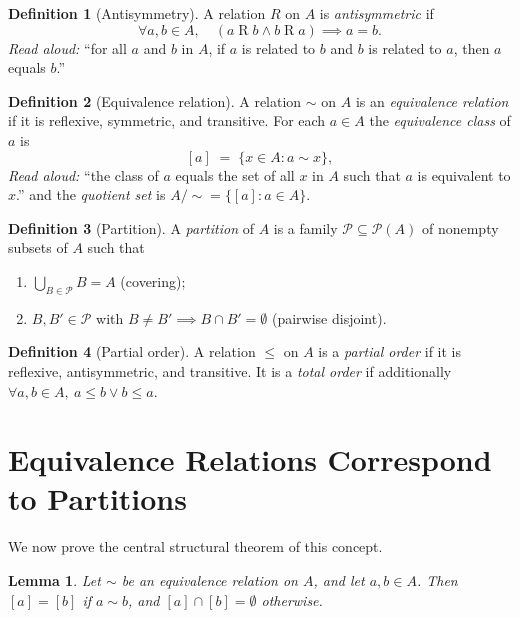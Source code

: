 \documentclass[11pt]{article}
\newtheorem{lemma}[theorem]{Lemma}
\theoremstyle{definition}
\newtheorem{definition}{Definition}
\begin{document}
\begin{definition}[Antisymmetry]
A relation $R$ on $A$ is \emph{antisymmetric} if
\[ \forall a, b \in A,\quad (a \mathrel{R} b \wedge b \mathrel{R} a) \implies a = b. \]
\emph{Read aloud:} ``for all $a$ and $b$ in $A$, if $a$ is related to $b$ and $b$ is related to $a$, then $a$ equals $b$.''
\end{definition}

\begin{definition}[Equivalence relation]
A relation $\sim$ on $A$ is an \emph{equivalence relation} if it is reflexive, symmetric, and transitive. For each $a \in A$ the \emph{equivalence class} of $a$ is
\[ [a] \;=\; \{ x \in A : a \sim x \}, \]
\emph{Read aloud:} ``the class of $a$ equals the set of all $x$ in $A$ such that $a$ is equivalent to $x$.''
and the \emph{quotient set} is $A/{\sim} = \{ [a] : a \in A \}$.
\end{definition}

\begin{definition}[Partition]
A \emph{partition} of $A$ is a family $\mathcal{P} \subseteq \mathcal{P}(A)$ of nonempty subsets of $A$ such that
\begin{enumerate}[label=(P\arabic*)]
  \item $\bigcup_{B \in \mathcal{P}} B = A$ (covering);
  \item $B, B' \in \mathcal{P}$ with $B \neq B' \implies B \cap B' = \emptyset$ (pairwise disjoint).
\end{enumerate}
\end{definition}

\begin{definition}[Partial order]
A relation $\le$ on $A$ is a \emph{partial order} if it is reflexive, antisymmetric, and transitive. It is a \emph{total order} if additionally $\forall a, b \in A,\ a \le b \vee b \le a$.
\end{definition}

\section{Equivalence Relations Correspond to Partitions}

We now prove the central structural theorem of this concept.

\begin{lemma}\label{lem:classes-disjoint-or-equal}
Let $\sim$ be an equivalence relation on $A$, and let $a, b \in A$. Then $[a] = [b]$ if $a \sim b$, and $[a] \cap [b] = \emptyset$ otherwise.
\end{lemma}
\end{document}
